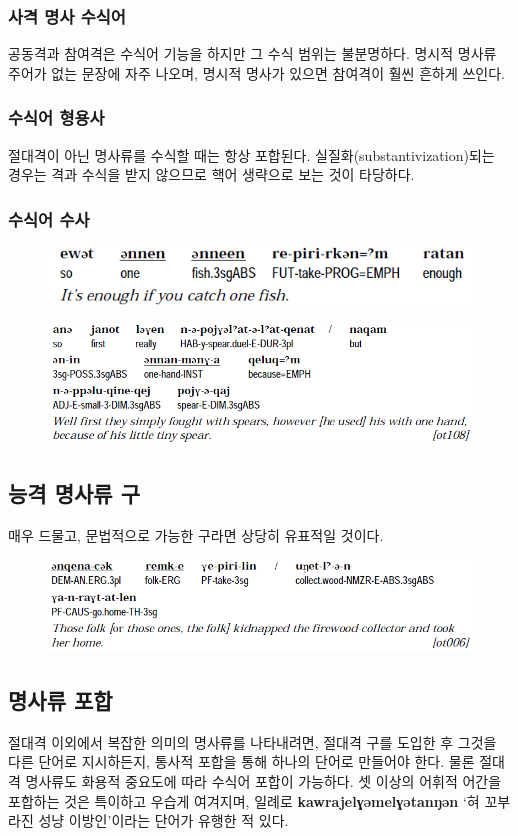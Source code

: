 \subsubsection{사격 명사 수식어}
공동격과 참여격은 수식어 기능을 하지만 그 수식 범위는 불분명하다. 명시적 명사류 주어가 없는 문장에 자주 나오며, 명시적 명사가 있으면 참여격이 훨씬 흔하게 쓰인다.
\subsubsection{수식어 형용사}
절대격이 아닌 명사류를 수식할 때는 항상 포합된다. 실질화(substantivization)되는 경우는 격과 수식을 받지 않으므로 핵어 생략으로 보는 것이 타당하다.
\subsubsection{수식어 수사}
\begin{figure}[H]
\centerline{\includegraphics{Chukchi/src/chnu.png}}
\end{figure}
\begin{figure}[H]
\centerline{\includegraphics{Chukchi/src/chno.png}}
\end{figure}
\subsection{능격 명사류 구}
매우 드물고, 문법적으로 가능한 구라면 상당히 유표적일 것이다.
\begin{figure}[H]
\centerline{\includegraphics{Chukchi/src/cher.png}}
\end{figure}
\subsection{명사류 포합}
절대격 이외에서 복잡한 의미의 명사류를 나타내려면, 절대격 구를 도입한 후 그것을 다른 단어로 지시하든지, 통사적 포합을 통해 하나의 단어로 만들어야 한다. 물론 절대격 명사류도 화용적 중요도에 따라 수식어 포합이 가능하다. 셋 이상의 어휘적 어간을 포합하는 것은 특이하고 우습게 여겨지며, 일례로 \textbf{kawrajelɣəmelɣətanŋən} `혀 꼬부라진 성냥 이방인'이라는 단어가 유행한 적 있다.
